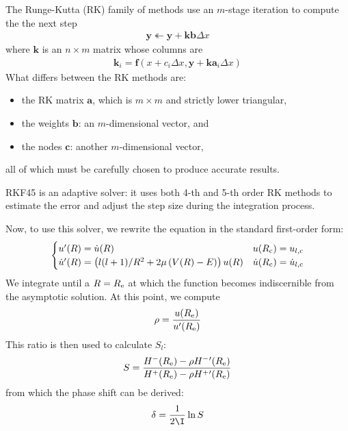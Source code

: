 \documentclass[fleqn, 12pt]{article}
\begin{document}
\begin{enumerate}
  The Runge-Kutta (RK) family of methods use an $m$-stage iteration to compute
  the the next step
  \begin{align*}
    \bm y \twoheadleftarrow \bm y + \bm k \bm b \Delta x
  \end{align*}
  where $\bm k$ is an $n \times m$ matrix whose columns are
  \begin{align*}
    \bm k_i = \bm f(x + c_i \Delta x, \bm y + \bm k \bm a_i \Delta x)
  \end{align*}
  What differs between the RK methods are:
  \begin{itemize}
  \item the RK matrix $\bm a$, which is $m \times m$ and strictly lower
    triangular,
  \item the weights $\bm b$: an $m$-dimensional vector, and
  \item the nodes $\bm c$: another $m$-dimensional vector,
  \end{itemize}
  all of which must be carefully chosen to produce accurate results.

  RKF45 is an adaptive solver: it uses both 4-th and 5-th order RK methods to
  estimate the error and adjust the step size during the integration process.

  Now, to use this solver, we rewrite the equation in the standard first-order
  form:
  \begin{align*}
    \begin{cases}
      u'(R) = \dot u(R) &
      u(R_{\text c}) = u_{l,{\text c}} \\
      \dot u'(R) = \left(l (l + 1) / R^2 +
        2 \mu \left(V(R) - E\right)\right)
      u(R) &
      \dot u(R_{\text c}) = \dot u_{l,{\text c}} \\
    \end{cases}
  \end{align*}
  We integrate until a $R = R_{\text e}$ at which the function becomes
  indiscernible from the asymptotic solution.  At this point, we compute
  \begin{align*}
    \rho = \frac{u(R_{\text e})}{u'(R_{\text e})}
  \end{align*}
  This ratio is then used to calculate $S_l$:
  \begin{align*}
    S = \frac{H^-(R_{\text e}) - \rho H^-{}'(R_{\text e})}{
    H^+(R_{\text e}) - \rho H^+{}'(R_{\text e})}
  \end{align*}
  from which the phase shift can be derived:
  \begin{align*}
    \delta = \frac{1}{2 \I} \ln S
  \end{align*}


\end{enumerate}
\end{document}
